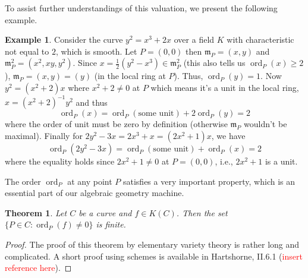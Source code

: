 \documentclass[12pt]{article}
\newtheorem{theorem}{Theorem}[subsection]
\theoremstyle{remark}
\theoremstyle{definition}
\newtheorem{example}{Example}[subsection]
\newcommand{\ord}[0]{\operatorname{ord}}
\begin{document}
        \noindent To assist further understandings of this valuation, we present the following example.
        \begin{example}
            Consider the curve $y^2=x^3+2x$ over a field $K$ with characteristic not equal to $2$, which is smooth. Let $P=(0, 0)$ then $\mathfrak m_P=(x, y)$ and $\mathfrak m_P^2=(x^2,xy,y^2)$. Since $x=\frac{1}{2}(y^2-x^3)\in\mathfrak m_P^2$ (this also tells us $\ord_P(x)\geqslant 2$), $\mathfrak m_P=(x, y)=(y)$ (in the local ring at $P$). Thus, $\ord_P(y)=1$. Now $y^2=(x^2+2)x$ where $x^2+2\neq 0$ at $P$ which means it's a unit in the local ring, $x=(x^2+2)^{-1}y^2$ and thus
            \[\ord_P(x)=\ord_P(\text{some unit})+2\ord_P(y)=2\]
            where the order of unit must be zero by definition (otherwise $\mathfrak m_P$ wouldn't be maximal). Finally for $2y^2-3x=2x^3+x=(2x^2+1)x$, we have
            \[\ord_P(2y^2-3x)=\ord_P(\text{some unit})+\ord_P(x)=2\]
            where the equality holds since $2x^2+1\neq 0$ at $P=(0, 0)$, i.e., $2x^2+1$ is a unit.
        \end{example}
        
        The order $\ord_P$ at any point $P$ satisfies a very important property, which is an essential part of our algebraic geometry machine.
        \begin{theorem}\label{theorem-fin-ord}
            Let $C$ be a curve and $f\in K(C)$. Then the set $\{P\in C:\ord_P(f)\neq 0\}$ is finite.
        \end{theorem}
        \begin{proof}
            The proof of this theorem by elementary variety theory is rather long and complicated. A short proof using schemes is available in Hartshorne, II.6.1 (\textcolor{red}{insert reference here}).
        \end{proof}
        
\end{document}
